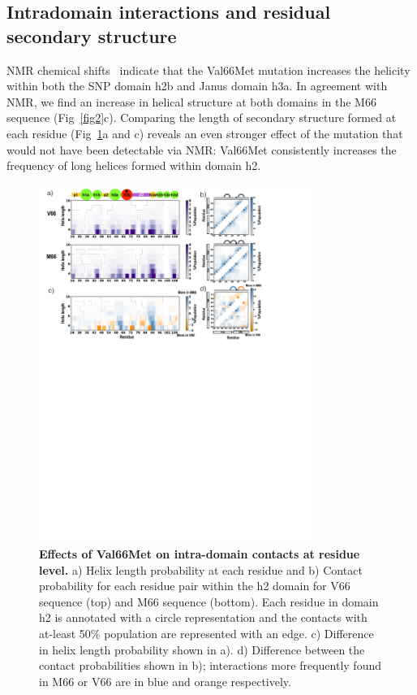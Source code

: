 \documentclass[10pt,letterpaper]{article}
\begin{document}
\subsection{Intradomain interactions and residual secondary structure}

NMR chemical shifts~\cite{Anastasia2013} indicate that the Val66Met mutation increases the helicity within both the SNP domain h2b and Janus domain h3a. In agreement with NMR, we find an increase in helical structure at both domains in the M66 sequence (Fig~\ref{fig2}c). Comparing the length of secondary structure formed at each residue (Fig~\ref{fig5}a and c) reveals an even stronger effect of the mutation that would not have been detectable via NMR: Val66Met consistently increases the frequency of long helices formed within domain h2. 

\begin{figure}[!ht]
\includegraphics[scale=0.5,width=0.8\textwidth,trim={0 0cm 0 0cm},clip]{../figures/fig5.pdf}

\caption{{\bf Effects of Val66Met on intra-domain contacts at residue level.} a) Helix length probability at each residue and b) Contact probability for each residue pair within the h2 domain for V66 sequence (top) and M66 sequence (bottom). Each residue in domain h2 is annotated with a circle representation and the contacts with at-least 50\% population are represented with an edge. c) Difference in helix length probability shown in a). d) Difference between the contact probabilities shown in b); interactions more frequently found in M66 or V66 are in blue and orange respectively. }

\label{fig5} 
\end{figure}
\end{document}
